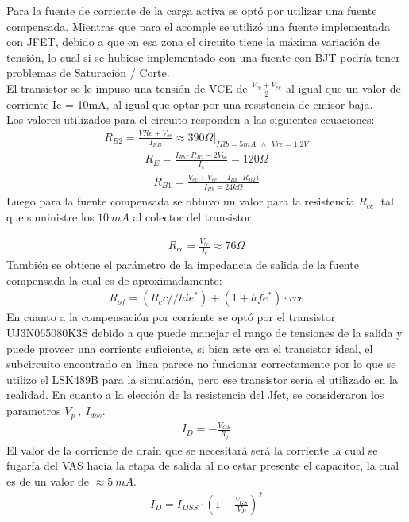 Para la fuente de corriente de la carga activa se optó por utilizar una fuente compensada. Mientras que para el acomple se utilizó una fuente implementada con JFET, debido a que en esa zona el circuito tiene la máxima variación de tensión, lo cual si se hubiese implementado con una fuente con BJT podría tener problemas de Saturación / Corte.\\
El transistor se le impuso una tensión de VCE de $\frac{V_{cc}+V_{ee}}{2}$ al igual que un valor de corriente Ic = 10mA, al igual que optar por una resistencia de emisor baja.\\
Los valores utilizados para el circuito responden a las siguientes ecuaciones:
\begin{align}
R_{B2}= \frac{V{Re}+V_{be}}{I_{RB}} \approx 390 \Omega |_{IRb=5mA \  \ \wedge \ \  Vre=1.2V}
\end{align}
\begin{align}
R_E=\frac{I_{Rb}\cdot R_{B2}-2V_{be}}{I_c}=120\Omega
\end{align}
\begin{align}
R_{B1}= \frac{V_{cc}+V_{ee}-I_{Rb}\cdot R_{B2}) }{I_{Rb}=24k\Omega}
\end{align}
Luego para la fuente compensada se obtuvo un valor para la resistencia $R_{cc}$, tal que suministre los $10 \ mA$ al colector del transistor.

\begin{align}
R_{cc}=\frac{V_{be}}{I_c}\approx 76\Omega
\end{align}
También se obtiene el parámetro de la impedancia de salida de la fuente compensada la cual es de aproximadamente:
\begin{align}
R_{of} = (R_cc // hie^*)+(1+hfe^* )\cdot rce
\end{align}
En cuanto a la compensación por corriente se optó por el transistor UJ3N065080K3S debido a que puede manejar el rango de tensiones de la salida y puede proveer una corriente suficiente, si bien este era el transistor ideal, el subcircuito encontrado en linea parece no funcionar correctamente por lo que se utilizo el LSK489B para la simulación, pero ese transistor sería el utilizado en la realidad. En cuanto a la  elección de la resistencia del Jfet, se consideraron los parametros $V_p \ , \ I_{dss}$.
\begin{align}
I_D=-\frac{V_{GS}}{R_j}
\end{align}
El valor de la corriente de drain que se necesitará será la corriente la cual se fugaría del VAS hacia la etapa de salida al no estar presente el capacitor, la cual es de un valor de $\approx 5 \ mA$.
\begin{align}
I_D= I_{DSS} \cdot \left(1-\frac{V_{GS}}{V_P} \right)^2
\end{align}

